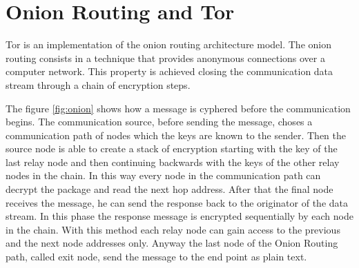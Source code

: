 \section{Onion Routing and Tor}
\label{sec:tor}
Tor is an implementation of the onion routing architecture model. The
onion routing consists in a technique that provides anonymous
connections over a computer network\cite{goldschlag1999onion}.
This property is achieved closing the communication data stream through a
chain of encryption steps. 

The figure \ref{fig:onion} shows how a
message is cyphered before the communication begins. The communication
source, before sending the message, choses a communication path of nodes
which the keys are known to the sender.
Then the source node is able to create a stack of encryption starting
with the key of the last relay node and then continuing backwards with
the keys of the other relay nodes in the chain. In this way every node
in the communication path can decrypt the package and read the next hop
address. After that the final node receives the message, he can send the
response back to the originator of the data stream. In this phase the response
message is encrypted sequentially by each node in the chain. 
With this method each relay node can gain access to the
previous and the next node addresses only. Anyway the last node of the
Onion Routing path, called exit node, send the message to the end point
as plain text.

